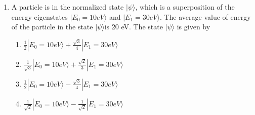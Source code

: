\documentclass[journal]{IEEEtran}
\begin{document}
\begin{enumerate}[start=37]
\item  A particle is in the normalized state $|\psi\rangle$, which is a superposition of the energy eigenstates $|E_{0} = 10eV\rangle$ and $|E_{1} = 30eV\rangle$. The average value of energy of the particle in the state $|\psi\rangle$is 20 eV. The state $|\psi\rangle$ is given by 
\begin{multicols}{2}  
\begin{enumerate}
\item $\frac{1}{2} |E_{0} = 10eV\rangle + \frac{\sqrt{3}}{4} |E_{1} = 30eV\rangle $
\item $\frac{1}{\sqrt{3}}|E_{0} = 10eV\rangle + \frac{\sqrt{2}}{3} |E_{1} = 30eV\rangle$ 
\item $\frac{1}{2} |E_{0} = 10 eV\rangle - \frac{\sqrt{3}}{4}|E_{1} = 30 eV\rangle$ 
\item $\frac{1}{\sqrt{2}}|E_{0} = 10eV\rangle - \frac{1}{\sqrt{2}} |E_{1} = 30eV\rangle$
\end{enumerate}
\end{multicols}













\end{enumerate}
\end{document}
